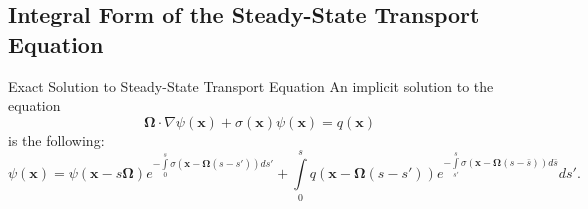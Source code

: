 \subsection{Integral Form of the Steady-State Transport Equation}
\begin{theorem}{Exact Solution to Steady-State Transport Equation}
   An implicit solution to the equation
   \begin{equation}\label{PDEss}
      \mathbf{\Omega}\cdot\nabla\psi(\mathbf{x})
      + \sigma(\mathbf{x})\psi(\mathbf{x}) = q(\mathbf{x})
   \end{equation}
   is the following:
   \begin{equation}\label{exactss}
      \psi(\mathbf{x}) = \psi(\mathbf{x} - s\mathbf{\Omega})
         e^{-\int\limits_0^s \sigma(\mathbf{x} - \mathbf{\Omega}(s -s'))ds'} +
         \int\limits_0^s q(\mathbf{x} - \mathbf{\Omega}(s -s'))
         e^{-\int\limits_{s'}^s\sigma(\mathbf{x}
         - \mathbf{\Omega}(s -\bar{s}))d\bar{s}} ds'.
   \end{equation}
\end{theorem}

